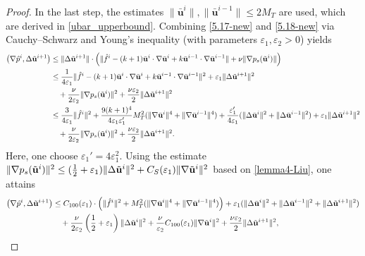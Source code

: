 \documentclass{article}
\theoremstyle{definition}                   %
\begin{document}
\begin{proof}
In the last step, the estimates $ \|\bar{\mathbf{u}}^i\|,  \|\bar{\mathbf{u}}^{i-1}\|\le 2 M_T$ are used, which are derived in \eqref{ubar_upperbound}.
%
%
Combining \eqref{5.17-new} and \eqref{5.18-new} via Cauchy--Schwarz and
Young's inequality (with parameters $\varepsilon_1,\varepsilon_2>0$) yields
\begin{align}
\big( \nabla \hat{p}^i, \Delta \tilde{\bf u}^{i+1}\big) 
&\le \| \Delta \tilde{\bf u}^{i+1} \| \cdot
\Big( \| \hat{f}^i
- (k+1)\bar{\bf u}^{i}\cdot\nabla\bar{\bf u}^{i}
+ k \bar{\bf u}^{i-1}\cdot\nabla\bar{\bf u}^{i-1} \|
+ \nu \|\nabla p_s(\tilde{\bf u}^i) \| \Big) \notag \\
&\le \frac{1}{4\varepsilon_1} \| \hat{f}^i
- (k+1)\bar{\bf u}^{i}\cdot\nabla\bar{\bf u}^{i}
+ k \bar{\bf u}^{i-1}\cdot\nabla\bar{\bf u}^{i-1} \|^2
+ \varepsilon_1 \| \Delta \tilde{\bf u}^{i+1} \| ^2
\notag\\
& \quad + \frac{\nu}{2\varepsilon_2} \|\nabla p_s(\tilde{\bf u}^i) \|^2
+ \frac{\nu\varepsilon_2}{2}  \| \Delta \tilde{\bf u}^{i+1} \| ^2 \notag\\
& \le \frac{3}{4\varepsilon_1} \| \hat{f}^i\|^2 
+ \frac{9(k+1)^4}{4\varepsilon_1\varepsilon_1'} 
M^2_T ( \| \nabla\bar{\bf u}^{i} \|^4 
  + \| \nabla\bar{\bf u}^{i-1} \|^4 ) 
  + \frac{\varepsilon_1'}{4\varepsilon_1} 
  (\| \Delta\bar{\bf u}^{i} \|^2
   + \| \Delta\bar{\bf u}^{i-1} \|^2  ) 
+ \varepsilon_1 \| \Delta \tilde{\bf u}^{i+1} \| ^2
\notag\\
& \quad + \frac{\nu}{2\varepsilon_2} \|\nabla p_s(\tilde{\bf u}^i) \|^2
+ \frac{\nu\varepsilon_2}{2}  \| \Delta \tilde{\bf u}^{i+1} \| ^2.
\end{align}
Here, one choose $\varepsilon_1'=4\varepsilon_1^2$. Using  the estimate 
$\|\nabla p_s(\tilde{\bf u}^i) \|^2
\le (\frac{1}{2}+\varepsilon_1) \|\Delta\tilde {\bf u}^i\|^2 + C_S(\varepsilon_1) \|\nabla \tilde{\bf  u}^i\|^2$ based on \eqref{lemma4-Liu}, one attains  
\begin{align}
\big( \nabla \hat{p}^i, \Delta \tilde{\bf u}^{i+1}\big) 
&\le 
C_{100}(\varepsilon_1) \cdot \Big(  \|\hat{f}^i\|^2 + M_T^2 ( \|\nabla\bar{\bf u}^i\|^4 + \|\nabla\bar{\bf u}^{i-1}\|^4 ) \Big)
+ \varepsilon_1 (\|\Delta\bar{\bf u}^i\|^2 + \|\Delta\bar{\bf u}^{i-1}\|^2 + \| \Delta \tilde{\bf u}^{i+1} \| ^2)\notag\\
& \quad + \frac{\nu}{2\varepsilon_2}\left( \frac{1}{2} + \varepsilon_1\right) \|\Delta \tilde{\bf u}^i \|^2
+ \frac{\nu}{\varepsilon_2} C_{100}(\varepsilon_1) \|\nabla\tilde{\bf u}^i \|^2
+ \frac{\nu\varepsilon_2}{2}  \| \Delta \tilde{\bf u}^{i+1} \| ^2,

\end{align}
\end{proof}
\end{document}
